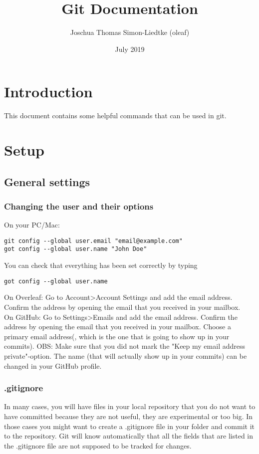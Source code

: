 \documentclass{article}
\title{Git Documentation}
\author{Joschua Thomas Simon-Liedtke (oleaf)}
\date{July 2019}
\begin{document}
\maketitle

\tableofcontents

\section{Introduction}
This document contains some helpful commands that can be used in git.

\section{Setup}

\subsection{General settings}

\subsubsection{Changing the user and their options}

On your PC/Mac:
\begin{verbatim}
git config --global user.email "email@example.com"
got config --global user.name "John Doe"
\end{verbatim}
You can check that everything has been set correctly by typing
\begin{verbatim}
got config --global user.name
\end{verbatim}

On Overleaf:
Go to Account\textgreater  Account Settings and add the email address. Confirm the address by opening the email that you received in your mailbox.
\\

On GitHub:
Go to Settings\textgreater  Emails and add the email address. Confirm the address by opening the email that you received in your mailbox. Choose a primary email address(, which is the one that is going to show up in your commits). OBS: Make sure that you did not mark the "Keep my email address private"-option. The name (that will actually show up in your commits) can be changed in your GitHub profile.

\subsubsection{.gitignore}
In many cases, you will have files in your local repository that you do not want to have committed because they are not useful, they are experimental or too big. In those cases you might want to create a .gitignore file in your folder and commit it to the repository. Git will know automatically that all the fields that are listed in the .gitignore file are not supposed to be tracked for changes.
\end{document}
